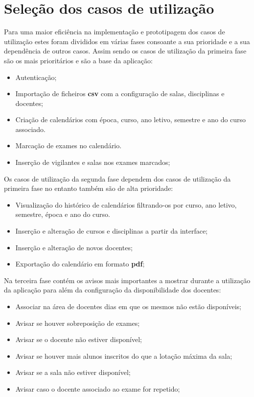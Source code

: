 \documentclass[11pt, twoside]{report}
\begin{document}
	\section{Seleção dos casos de utilização}
	\label{selecaocasosdeuso}
	
	Para uma maior eficiência na implementação e prototipagem dos casos de utilização estes foram divididos em várias fases consoante a sua prioridade e a sua dependência de outros casos. Assim sendo os casos de utilização da primeira fase são os mais prioritários e são a base da aplicação:
	
	\begin{itemize}
		\item Autenticação;
		\item Importação de ficheiros \textbf{csv} com a configuração de salas, disciplinas e docentes;
	 	\item Criação de calendários com época, curso, ano letivo, semestre e ano do curso associado.
	 	\item Marcação de exames no calendário.
	 	\item Inserção de vigilantes e salas nos exames marcados;
	\end{itemize}
	
	Os casos de utilização da segunda fase dependem dos casos de utilização da primeira fase no entanto também são de alta prioridade: 
	
	\begin{itemize}
		\item Visualização do histórico de calendários filtrando-os por curso, ano letivo, semestre, época e ano do curso.
		\item Inserção e alteração de cursos e disciplinas a partir da interface;
		\item Inserção e alteração de novos docentes;
		\item Exportação do calendário em formato \textbf{pdf};
	\end{itemize}


	Na terceira fase contém os avisos mais importantes a mostrar durante a utilização da aplicação para além da configuração da disponibilidade dos docentes:
	
	\begin{itemize}
		\item Associar na área de docentes dias em que os mesmos não estão disponíveis;
		\item Avisar se houver sobreposição de exames;
		\item Avisar se o docente não estiver disponível;
		\item Avisar se houver mais alunos inscritos do que a lotação máxima da sala;
		\item Avisar se a sala não estiver disponível;
		\item Avisar caso o docente associado ao exame for repetido;
	\end{itemize}
	
\end{document}
